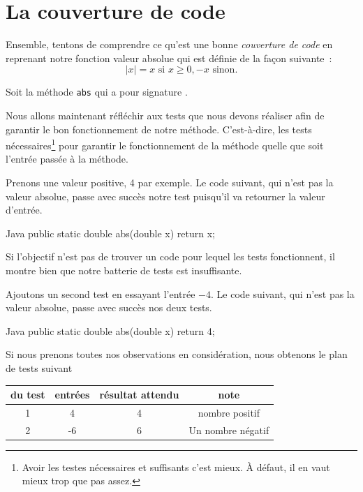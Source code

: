 \documentclass[a4paper,11pt]{style-esi/td}
\begin{document}
\section{La couverture de code}

	Ensemble, tentons de comprendre ce qu'est une bonne \emph{couverture de code} en reprenant notre fonction valeur absolue qui est définie de la façon suivante~:
	$$
		|x| = x \textrm{ si } x \geq 0, -x \textrm{ sinon}.
	$$

	Soit la méthode \texttt{abs} qui a pour signature .

	Nous allons maintenant réfléchir aux tests que nous devons réaliser afin de garantir le bon fonctionnement de notre méthode. C'est-à-dire, les tests nécessaires\footnote{Avoir les testes nécessaires et suffisants c'est mieux. À défaut, il en vaut mieux trop que pas assez.} pour garantir le fonctionnement de la méthode quelle que soit l'entrée passée à la méthode.

	Prenons une valeur positive, 4 par exemple. Le code suivant, qui n'est pas la valeur absolue, passe avec succès notre test puisqu'il va retourner la valeur d'entrée.
	\begin{Code}{Java}
		public static double abs(double x) {
			return x;
		}
	\end{Code}


	Si l'objectif n'est pas de trouver un code pour lequel les tests fonctionnent, il montre bien que notre batterie de tests est insuffisante.

	Ajoutons un second test en essayant l'entrée $-4$. Le code suivant, qui n'est pas la valeur absolue, passe avec succès nos deux tests. 

	\begin{Code}{Java}
		public static double abs(double x) {
			return 4;
		}
	\end{Code}

	Si nous prenons toutes nos observations en considération, nous obtenons le plan de tests suivant

	\begin{center}
		\begin{tabular}{|c|c|c|c|}
			\hline
			\no du test & entrées & résultat attendu & note \\
			\hline
			1 & 4 & 4 & nombre positif \\
			\hline
			2 & -6 & 6 & Un nombre négatif \\
			\hline
		\end{tabular}
	\end{center}
\end{document}
